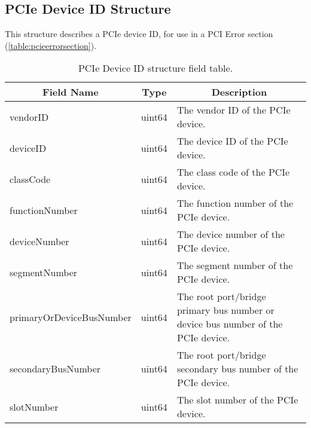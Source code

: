 \documentclass{report}
\newcommand*{\thead}[1]{\multicolumn{1}{|c|}{\bfseries #1}}
\newcommand*{\jsontable}[1]{
    \begin{table}[!ht]
    \label{#1}
    \centering
    \begin{adjustbox}{center}
    \begin{tabular}{|l|c|p{8cm}|}
    \hline
    \thead{Field Name} & \thead{Type} & \thead{Description} \\
    \hline
}
\newcommand*{\jsontableend}[1]{
    \hline
    \end{tabular}
    \end{adjustbox}
    \caption{#1}
    \label{table:#1}
    \end{table}
    \FloatBarrier
}
\begin{document}
\subsection{PCIe Device ID Structure}
\label{subsection:pciedeviceidstructure}
This structure describes a PCIe device ID, for use in a PCI Error section (\ref{table:pcieerrorsection}).
\jsontable{table:pciedeviceidstructure}
vendorID & uint64 & The vendor ID of the PCIe device.\\
\hline
deviceID & uint64 & The device ID of the PCIe device.\\
\hline
classCode & uint64 & The class code of the PCIe device.\\
\hline
functionNumber & uint64 & The function number of the PCIe device.\\
\hline
deviceNumber & uint64 & The device number of the PCIe device.\\
\hline
segmentNumber & uint64 & The segment number of the PCIe device.\\
\hline
primaryOrDeviceBusNumber & uint64 & The root port/bridge primary bus number or device bus number of the PCIe device.\\
\hline
secondaryBusNumber & uint64 & The root port/bridge secondary bus number of the PCIe device.\\
\hline
slotNumber & uint64 & The slot number of the PCIe device.\\
\jsontableend{PCIe Device ID structure field table.}
\end{document}
